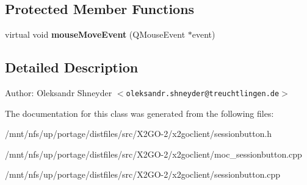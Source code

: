 \subsection*{Protected Member Functions}
\begin{CompactItemize}
\item 
virtual void \textbf{mouse\-Move\-Event} (QMouse\-Event $\ast$event)\label{classSessionButton_bfb27518381e81c2444fc515379580a0}

\end{CompactItemize}


\subsection{Detailed Description}
\begin{Desc}
\item[Author:]Oleksandr Shneyder $<$\tt{oleksandr.shneyder@treuchtlingen.de}$>$ \end{Desc}




The documentation for this class was generated from the following files:\begin{CompactItemize}
\item 
/mnt/nfs/up/portage/distfiles/src/X2GO-2/x2goclient/sessionbutton.h\item 
/mnt/nfs/up/portage/distfiles/src/X2GO-2/x2goclient/moc\_\-sessionbutton.cpp\item 
/mnt/nfs/up/portage/distfiles/src/X2GO-2/x2goclient/sessionbutton.cpp\end{CompactItemize}
